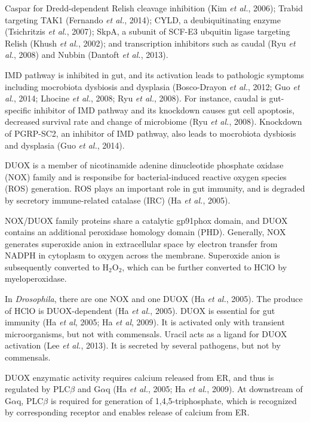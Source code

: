 \documentclass[11pt]{article}
\begin{document}
\begin{sloppypar}
Caspar for Dredd-dependent Relish cleavage inhibition (Kim \textit{et al.}, 2006); 
Trabid targeting TAK1 (Fernando \textit{et al.}, 2014); 
CYLD, a deubiquitinating enzyme (Tsichritzis \textit{et al.}, 2007); 
SkpA, a subunit of SCF-E3 ubquitin ligase targeting Relish (Khush \textit{et al.}, 2002); 
and transcription inhibitors such as caudal (Ryu \textit{et al.}, 2008) and Nubbin (Dantoft \textit{et al.}, 2013).
\par
IMD pathway is inhibited in gut, and its activation leads to pathologic symptoms including mocrobiota dysbiosis and dysplasia (Bosco-Drayon \textit{et al.}, 2012; Guo \textit{et al.}, 2014; Lhocine \textit{et al.}, 2008; Ryu \textit{et al.}, 2008). 
For instance, caudal is gut-specific inhibitor of IMD pathway and its knockdown causes gut cell apoptosis, decreased survival rate and change of microbiome (Ryu \textit{et al.}, 2008). 
Knockdown of PGRP-SC2, an inhibitor of IMD pathway, also leads to mocrobiota dysbiosis and dysplasia (Guo \textit{et al.}, 2014). 
\par
DUOX is a member of nicotinamide adenine dinucleotide phosphate oxidase (NOX) family and is responsibe for bacterial-induced reactive oxygen species (ROS) generation. 
ROS plays an important role in gut immunity, and is degraded by secretory immune-related catalase (IRC) (Ha \textit{et al.}, 2005).
\par
NOX/DUOX family proteins share a catalytic gp91phox domain, and DUOX contains an additional peroxidase homology domain (PHD). 
Generally, NOX generates superoxide anion in extracellular space by electron transfer from NADPH in cytoplasm to oxygen across the membrane. 
Superoxide anion is subsequently converted to H$_2$O$_2$, which can be further converted to HClO by myeloperoxidase. 
\par
In \textit{Drosophila}, there are one NOX and one DUOX (Ha \textit{et al.}, 2005). 
The produce of HClO is DUOX-dependent (Ha \textit{et al.}, 2005). 
DUOX is essential for gut immunity (Ha \textit{et al}, 2005; Ha \textit{et al}, 2009). 
It is activated only with transient microorganisms, but not with commensals. 
Uracil acts as a ligand for DUOX activation (Lee \textit{et al.}, 2013). 
It is secreted by several pathogens, but not by commensals.
\par
DUOX enzymatic activity requires calcium released from ER, and thus is regulated by PLC$\beta$ and G$\alpha$q (Ha \textit{et al.}, 2005; Ha \textit{et al.}, 2009). 
At downstream of G$\alpha$q, PLC$\beta$ is required for generation of 1,4,5-triphosphate, which is recognized by corresponding receptor and enables release of calcium from ER. 

\end{sloppypar}
\end{document}
